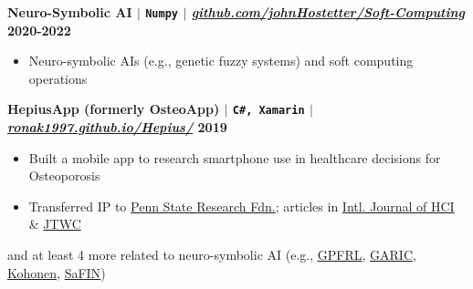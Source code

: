 \documentclass[11pt]{article} %
\begin{document}
\vspace{-4pt}

\noindent\textbf{Neuro-Symbolic AI\textsuperscript{\dag} $|$ \texttt{Numpy} $|$ \href{https://github.com/johnHostetter/Soft-Computing}{\normalfont\textit{github.com/johnHostetter/Soft-Computing}} \hfill 2020-2022}
\vspace{-6pt}
\begin{itemize}
\setlength\itemsep{-0.5em}
  \item Neuro-symbolic AIs (e.g., genetic fuzzy systems) and soft computing operations
\end{itemize}


\vspace{-4pt}


\noindent\textbf{HepiusApp (formerly OsteoApp) $|$ \texttt{C\#, Xamarin} $|$ \href{https://ronak1997.github.io/Hepius/}{\normalfont\textit{ronak1997.github.io/Hepius/}} \hfill 2019}
\vspace{-6pt}
\begin{itemize}
\setlength\itemsep{-0.5em}
  \item Built a mobile app to research smartphone use in healthcare decisions for Osteoporosis
  \item Transferred IP to \href{https://ott.psu.edu/penn-state-research-foundation/}{Penn State Research Fdn.}; articles in \href{https://pure.psu.edu/en/publications/development-and-patient-user-experience-evaluation-of-an-mhealth-}{Intl. Journal of HCI} \& \href{https://pure.psu.edu/en/publications/mhealth-apps-for-older-adults-a-method-for-development-and-user-e}{JTWC} %
\end{itemize}
\vspace{-4pt}
\noindent
and at least 4 more related to neuro-symbolic AI (e.g., \href{https://github.com/johnHostetter/GPFRL}{GPFRL}, \href{https://github.com/johnHostetter/GARIC}{GARIC}, \href{https://github.com/johnHostetter/Kohonen}{Kohonen}, \href{https://github.com/johnHostetter/Neuro-Fuzzy-Networks}{SaFIN})
\end{document}
